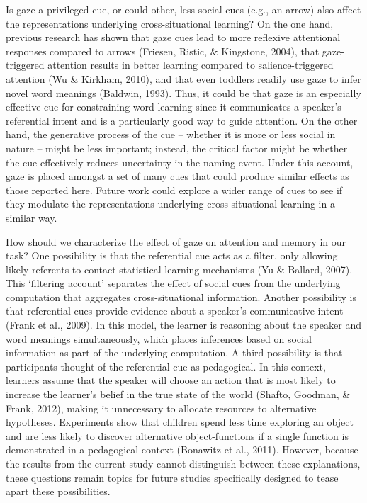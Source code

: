 \documentclass[authoryear, review]{elsarticle}
\begin{document}
Is gaze a privileged cue, or could other, less-social cues (e.g., an
arrow) also affect the representations underlying cross-situational
learning? On the one hand, previous research has shown that gaze cues
lead to more reflexive attentional responses compared to arrows
(Friesen, Ristic, \& Kingstone, 2004), that gaze-triggered attention
results in better learning compared to salience-triggered attention (Wu
\& Kirkham, 2010), and that even toddlers readily use gaze to infer
novel word meanings (Baldwin, 1993). Thus, it could be that gaze is an
especially effective cue for constraining word learning since it
communicates a speaker's referential intent and is a particularly good
way to guide attention. On the other hand, the generative process of the
cue -- whether it is more or less social in nature -- might be less
important; instead, the critical factor might be whether the cue
effectively reduces uncertainty in the naming event. Under this account,
gaze is placed amongst a set of many cues that could produce similar
effects as those reported here. Future work could explore a wider range
of cues to see if they modulate the representations underlying
cross-situational learning in a similar way.

How should we characterize the effect of gaze on attention and memory in
our task? One possibility is that the referential cue acts as a filter,
only allowing likely referents to contact statistical learning
mechanisms (Yu \& Ballard, 2007). This `filtering account' separates the
effect of social cues from the underlying computation that aggregates
cross-situational information. Another possibility is that referential
cues provide evidence about a speaker's communicative intent (Frank et
al., 2009). In this model, the learner is reasoning about the speaker
and word meanings simultaneously, which places inferences based on
social information as part of the underlying computation. A third
possibility is that participants thought of the referential cue as
pedagogical. In this context, learners assume that the speaker will
choose an action that is most likely to increase the learner's belief in
the true state of the world (Shafto, Goodman, \& Frank, 2012), making it
unnecessary to allocate resources to alternative hypotheses. Experiments
show that children spend less time exploring an object and are less
likely to discover alternative object-functions if a single function is
demonstrated in a pedagogical context (Bonawitz et al., 2011). However,
because the results from the current study cannot distinguish between
these explanations, these questions remain topics for future studies
specifically designed to tease apart these possibilities.
\end{document}

